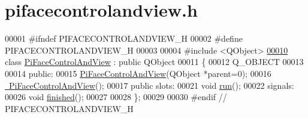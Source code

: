 \hypertarget{pifacecontrolandview_8h_source}{}\section{pifacecontrolandview.\+h}
\label{pifacecontrolandview_8h_source}

\begin{DoxyCode}
00001 \textcolor{preprocessor}{#ifndef PIFACECONTROLANDVIEW\_H}
00002 \textcolor{preprocessor}{#define PIFACECONTROLANDVIEW\_H}
00003 
00004 \textcolor{preprocessor}{#include <QObject>}
\hypertarget{pifacecontrolandview_8h_source.tex_l00010}{}\hyperlink{classPiFaceControlAndView}{00010} \textcolor{keyword}{class }\hyperlink{classPiFaceControlAndView}{PiFaceControlAndView} : \textcolor{keyword}{public} QObject
00011 \{
00012     Q\_OBJECT
00013 
00014 \textcolor{keyword}{public}:
00015     \hyperlink{classPiFaceControlAndView_aaf210318d47c72e1262372662c554c25}{PiFaceControlAndView}(QObject *parent=0);
00016     \hyperlink{classPiFaceControlAndView_aeb3977adb33eddb01288de16cffc1730}{~PiFaceControlAndView}();
00017 \textcolor{keyword}{public} slots:
00021     \textcolor{keywordtype}{void} \hyperlink{classPiFaceControlAndView_a5463b09284910cea9db7997f59b5345a}{run}();
00022 signals:
00026     \textcolor{keywordtype}{void} \hyperlink{classPiFaceControlAndView_a704d233cb698bce10515c0af721581ce}{finished}();
00027 
00028 \};
00029 
00030 \textcolor{preprocessor}{#endif // PIFACECONTROLANDVIEW\_H}
\end{DoxyCode}

